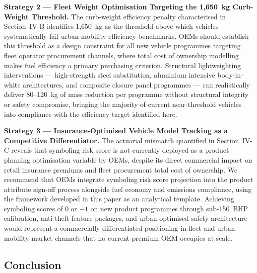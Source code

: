 \documentclass[conference]{IEEEtran}
\begin{document}
\textbf{Strategy 2 — Fleet Weight Optimisation Targeting the
1,650~kg Curb-Weight Threshold.}
The curb-weight efficiency penalty characterised in Section~IV-B
identifies 1,650~kg as the threshold above which vehicles
systematically fail urban mobility efficiency benchmarks. OEMs
should establish this threshold as a design constraint for all
new vehicle programmes targeting fleet operator procurement
channels, where total cost of ownership modelling makes fuel
efficiency a primary purchasing criterion. Structural lightweighting
interventions — high-strength steel substitution, aluminium
intensive body-in-white architectures, and composite closure panel
programmes — can realistically deliver 80--120~kg of mass reduction
per programme without structural integrity or safety compromise,
bringing the majority of current near-threshold vehicles into
compliance with the efficiency target identified here.

\textbf{Strategy 3 — Insurance-Optimised Vehicle Model Tracking
as a Competitive Differentiator.}
The actuarial mismatch quantified in Section~IV-C reveals that
symboling risk score is not currently deployed as a product
planning optimisation variable by OEMs, despite its direct
commercial impact on retail insurance premiums and fleet
procurement total cost of ownership. We recommend that OEMs
integrate symboling risk score projection into the product
attribute sign-off process alongside fuel economy and emissions
compliance, using the framework developed in this paper as an
analytical template. Achieving symboling scores of $0$ or $-1$
on new product programmes through sub-150~BHP calibration,
anti-theft feature packages, and urban-optimised safety
architecture would represent a commercially differentiated
positioning in fleet and urban mobility market channels that
no current premium OEM occupies at scale.

\subsection{Conclusion}
\end{document}
